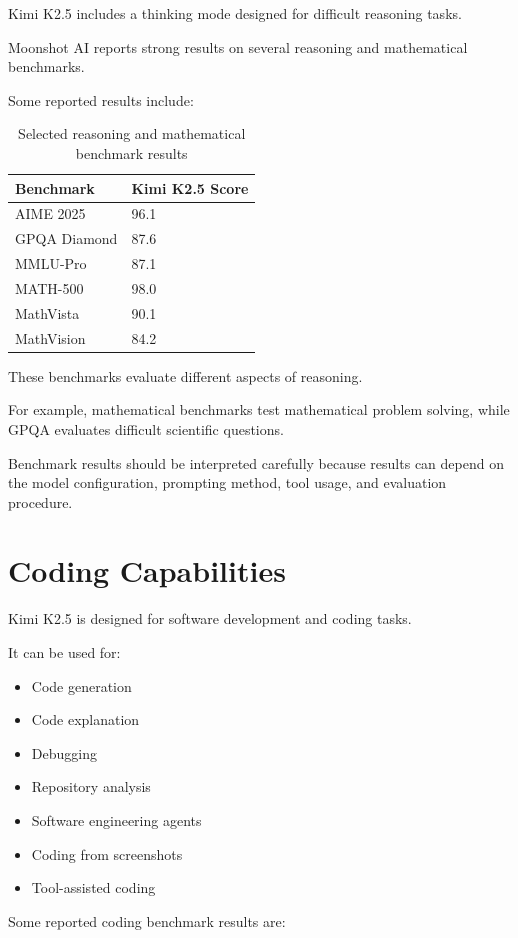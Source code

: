 \documentclass{article}
\begin{document}
Kimi K2.5 includes a thinking mode designed for difficult reasoning tasks.

Moonshot AI reports strong results on several reasoning and mathematical benchmarks.

Some reported results include:

\begin{table}[h]
\centering
\begin{tabular}{ll}
\hline
Benchmark & Kimi K2.5 Score \\
\hline
AIME 2025 & 96.1 \\
GPQA Diamond & 87.6 \\
MMLU-Pro & 87.1 \\
MATH-500 & 98.0 \\
MathVista & 90.1 \\
MathVision & 84.2 \\
\hline
\end{tabular}
\caption{Selected reasoning and mathematical benchmark results}
\end{table}

These benchmarks evaluate different aspects of reasoning.

For example, mathematical benchmarks test mathematical problem solving, while GPQA evaluates difficult scientific questions.

Benchmark results should be interpreted carefully because results can depend on the model configuration, prompting method, tool usage, and evaluation procedure.

\section{Coding Capabilities}

Kimi K2.5 is designed for software development and coding tasks.

It can be used for:

\begin{itemize}
\item Code generation
\item Code explanation
\item Debugging
\item Repository analysis
\item Software engineering agents
\item Coding from screenshots
\item Tool-assisted coding
\end{itemize}

Some reported coding benchmark results are:
\end{document}
